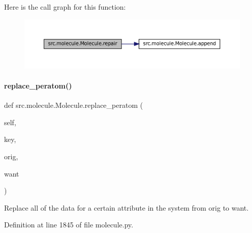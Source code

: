Here is the call graph for this function\+:
\nopagebreak
\begin{figure}[H]
\begin{center}
\leavevmode
\includegraphics[width=350pt]{classsrc_1_1molecule_1_1Molecule_aaf70e66c397fd1e77644339ec81dfa9e_cgraph}
\end{center}
\end{figure}
\mbox{\label{classsrc_1_1molecule_1_1Molecule_a10b21e9ed15d4d1d3242a2696a939e61}} 
\paragraph{\texorpdfstring{replace\+\_\+peratom()}{replace\_peratom()}}
{\footnotesize\ttfamily def src.\+molecule.\+Molecule.\+replace\+\_\+peratom (\begin{DoxyParamCaption}\item[{}]{self,  }\item[{}]{key,  }\item[{}]{orig,  }\item[{}]{want }\end{DoxyParamCaption})}



Replace all of the data for a certain attribute in the system from orig to want. 



Definition at line 1845 of file molecule.\+py.

\mbox{\label{classsrc_1_1molecule_1_1Molecule_a958636d732433ffc356a1f7a1e70d7d7}} 
